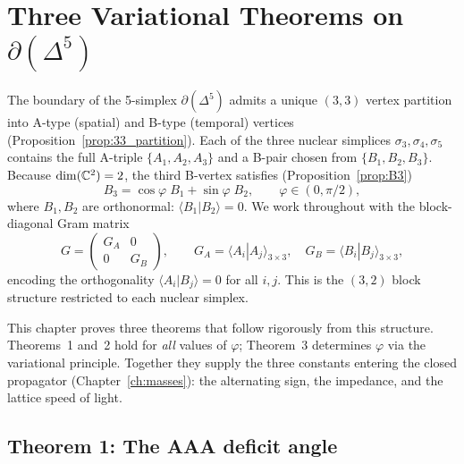 \section{Three Variational Theorems on $\partial(\Delta^5)$}
\label{ch:variational_theorems}

The boundary of the 5-simplex $\partial(\Delta^5)$ admits a unique
$(3,3)$ vertex partition into A-type (spatial) and B-type (temporal)
vertices (Proposition~\ref{prop:33_partition}).  Each of the three
nuclear simplices $\sigma_3, \sigma_4, \sigma_5$ contains the full
A-triple $\{A_1, A_2, A_3\}$ and a B-pair chosen from
$\{B_1, B_2, B_3\}$.  Because $\dim(\mathbb{C}^2) = 2$, the third B-vertex
satisfies (Proposition~\ref{prop:B3})
\begin{equation}\label{eq:B3_parametrize}
B_3 = \cos\varphi\; B_1 + \sin\varphi\; B_2,
\qquad \varphi \in (0, \pi/2),
\end{equation}
where $B_1, B_2$ are orthonormal: $\langle B_1 | B_2 \rangle = 0$.
We work throughout with the block-diagonal Gram matrix
\begin{equation}\label{eq:block_gram}
G = \begin{pmatrix} G_A & 0 \\ 0 & G_B \end{pmatrix},
\qquad
G_A = \langle A_i | A_j \rangle_{3\times 3},
\quad
G_B = \langle B_i | B_j \rangle_{3\times 3},
\end{equation}
encoding the orthogonality $\langle A_i | B_j \rangle = 0$ for all
$i, j$.  This is the $(3,2)$ block structure restricted to each
nuclear simplex.

This chapter proves three theorems that follow rigorously from this
structure.  Theorems~1 and~2 hold for \emph{all} values of $\varphi$;
Theorem~3 determines $\varphi$ via the variational principle.
Together they supply the three constants entering the closed propagator
(Chapter~\ref{ch:masses}): the alternating sign, the impedance, and
the lattice speed of light.

\subsection{Theorem 1: The AAA deficit angle}
\label{sec:thm_AAA}

